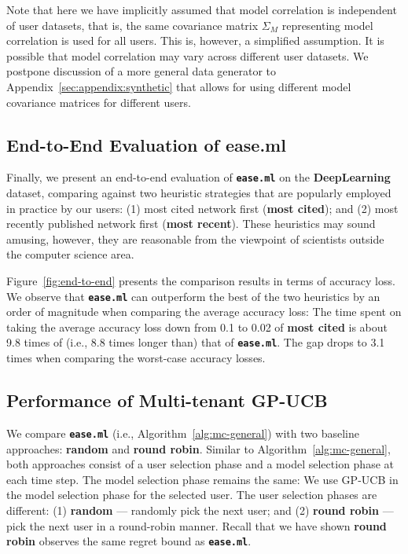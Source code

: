 \documentclass[letterpaper]{vldb}
\newcommand{\eml}{\texttt{ease.ml}\xspace}
\begin{document}
Note that here we have implicitly assumed that model correlation is independent of user datasets, that is, the same covariance matrix $\Sigma_M$ representing model correlation is used for all users.
This is, however, a simplified assumption.
It is possible that model correlation may vary across different user datasets.
We postpone discussion of a more general data generator to Appendix~\ref{sec:appendix:synthetic} that allows for using different model covariance matrices for different users.


\subsection{End-to-End Evaluation of ease.ml}

Finally, we present an end-to-end evaluation of {\bf \eml} on the {\bf DeepLearning} dataset, comparing against two heuristic strategies that are popularly employed in practice by our users: (1) most cited network first ({\bf most cited}); and (2) most recently published network first ({\bf most recent}).
These heuristics may sound amusing, however, they are reasonable from the viewpoint of scientists outside the computer science area.
\vspace{-0.5em}


Figure~\ref{fig:end-to-end} presents the comparison results in terms of accuracy loss.
We observe that {\bf \eml} can outperform the best of the two heuristics by an order of magnitude when comparing the average accuracy loss: The time spent on taking the average accuracy loss down from 0.1 to 0.02 of {\bf most cited} is about 9.8 times of (i.e., 8.8 times longer than) that of {\bf \eml}.
The gap drops to 3.1 times when comparing the worst-case accuracy losses.



\subsection{Performance of Multi-tenant GP-UCB}

We compare {\bf \eml} (i.e., Algorithm~\ref{alg:mc-general}) with two baseline approaches: {\bf random} and {\bf round robin}.
Similar to Algorithm~\ref{alg:mc-general}, both approaches consist of a user selection phase and a model selection phase at each time step.
The model selection phase remains the same: We use GP-UCB in the model selection phase for the selected user.
The user selection phases are different: (1) {\bf random} --- randomly pick the next user; and (2) {\bf round robin} --- pick the next user in a round-robin manner.
Recall that we have shown {\bf round robin} observes the same regret bound as {\bf \eml}. %
\end{document}
